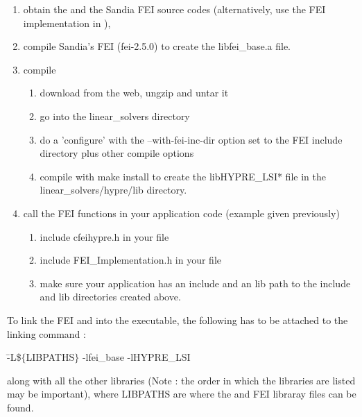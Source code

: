 \begin{enumerate}

\item obtain the \hypre{} and the Sandia FEI source codes (alternatively, use
      the {\sf FEI} implementation in \hypre{}),
\item compile Sandia's {\sf FEI} (fei-2.5.0) to create the
      {\sf libfei\_base.a} file.
\item compile \hypre{} 
\begin{enumerate}
\item download \hypre{} from the web, ungzip and untar it
\item go into the {\sf linear\_solvers} directory
\item do a 'configure' with the {\sf --with-fei-inc-dir} option set to
      the {\sf FEI} include directory plus other compile options
\item compile with {\sf make install} to create the
      {\sf libHYPRE\_LSI*} file in the {\sf linear\_solvers/hypre/lib}
      directory.
\end{enumerate}
\item call the {\sf FEI} functions in your application code (example given
      previously)
\begin{enumerate}
\item include {\sf cfei\-hypre.h} in your file 
\item include {\sf FEI\_Implementation.h} in your file 
\item make sure your application has an {\sf include} and an {\sf lib} path 
      to the {\sf include} and {\sf lib} directories created above. 
\end{enumerate}

\end{enumerate}


To link the {\sf FEI} and \hypre{} into the executable, the following has to be
attached to the linking command :

\begin{tabbing}
\hspace{0.5in} \= {\sf -L\$$\{$LIBPATHS$\}$ -lfei\_base -lHYPRE\_LSI} 
\end{tabbing}
along with all the other libraries (Note : the order in which the libraries are
listed may be important), where {\sf LIBPATHS} are where 
the \hypre{} and {\sf FEI} libraray files can be found.  

